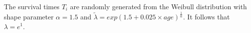 \documentclass[12pt,letterpaper]{article}
\begin{document}
The survival times $T_i$ are randomly generated from the Weibull distribution with shape parameter $\alpha=1.5$ and $\tilde{\lambda}=exp(1.5 +0.025 \times age)^{\frac{1}{\alpha}}$.  It follows that $\lambda = e^1$.

%
%
%
%
%
%
%
\end{document}
